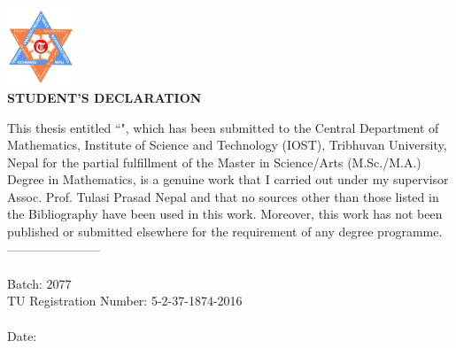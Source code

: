 

\begin{center}
  \includegraphics[width=0.15\textwidth]{pictures/tulogo.png}\\[1.5cm]

    {\Large{\bfseries{STUDENT'S DECLARATION}}}\\[.5cm]

  \end{center}


This thesis entitled ``\textbf{\thetitle}", which has been submitted to the Central Department of Mathematics, Institute of Science and Technology (IOST), Tribhuvan University, Nepal for the partial fulfillment of the Master in Science/Arts (M.Sc./M.A.) Degree  in Mathematics, is a genuine work that I carried out under my supervisor {\color{red} Assoc. Prof. Tulasi Prasad Nepal} and that no sources other than those listed in the Bibliography have been used in this work. Moreover, this work has not been published or submitted elsewhere for the requirement of any degree programme.
\\[1.5cm]
-----------------------\\
\theauthor\\
Batch: $2077$ \\
TU Registration Number: 5-2-37-1874-2016\\ \\
Date: \thedate

\clearpage